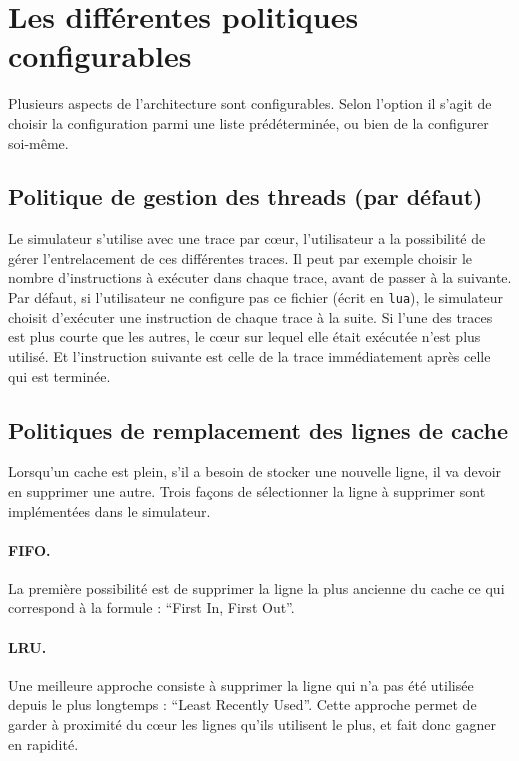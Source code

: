 \section{Les différentes politiques configurables}
\label{politiques}

Plusieurs aspects de l'architecture sont configurables. Selon l'option il s'agit de choisir la configuration parmi une liste prédéterminée, ou bien de la configurer soi-même. 

\subsection{Politique de gestion des threads (par défaut)}

Le simulateur s'utilise avec une trace par c\oe ur, l'utilisateur a la possibilité de gérer l'entrelacement de ces différentes traces. Il peut par exemple choisir le nombre d'instructions à exécuter dans chaque trace, avant de passer à la suivante. Par défaut, si l'utilisateur ne configure pas ce fichier (écrit en \texttt{lua}), le simulateur choisit d'exécuter une instruction de chaque trace à la suite. Si l'une des traces est plus courte que les autres, le c\oe ur sur lequel elle était exécutée n'est plus utilisé. Et l'instruction suivante est celle de la trace immédiatement après celle qui est terminée.

\subsection{Politiques de remplacement des lignes de cache}

Lorsqu'un cache est plein, s'il a besoin de stocker une nouvelle ligne, il va devoir en supprimer une autre. Trois façons de sélectionner la ligne à supprimer sont implémentées dans le simulateur. 

\paragraph{FIFO.}La première possibilité est de  supprimer la ligne la plus ancienne du cache ce qui correspond à la formule : ``First In, First Out''.

\paragraph{LRU.}Une meilleure approche consiste à supprimer la ligne qui n'a pas été utilisée depuis le plus longtemps : ``Least Recently Used''. Cette approche permet de garder à proximité du c\oe ur les lignes qu'ils utilisent le plus, et fait donc gagner en rapidité.

